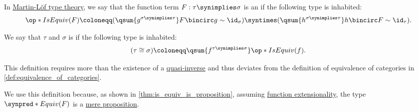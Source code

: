 \begin{definition}\label{def:equivalence_of_types}
  In \hyperref[def:martin_lof_type_theory]{Martin-L\"of type theory}, we say that the function term \( F: \tau \synimplies \sigma \) is an  if the following type is inhabited:
  \begin{equation*}
    \op*{IsEquiv}(F) \coloneqq (\qsum {g^{\sigma \synimplies \tau}} F \bincirc g \sim \id_\sigma) \syntimes (\qsum {h^{\sigma \synimplies \tau}} h \bincirc F \sim \id_\tau).
  \end{equation*}

  We say that \( \tau \) and \( \sigma \) is  if the following type is inhabited:
  \begin{equation*}
    (\tau \cong \sigma) \coloneqq \qsum {f^{\tau \synimplies \sigma}} \op*{IsEquiv}(f).
  \end{equation*}
\end{definition}
\begin{comments}
  \item This definition requires more than the existence of a \hyperref[def:arrow_type_quasi_inverse]{quasi-inverse} and thus deviates from the definition of equivalence of categories in \cref{def:equivalence_of_categories}.

  We use this definition because, as shown in \cref{thm:is_equiv_is_proposition}, assuming \hyperref[def:function_extensionality_axiom]{function extensionality}, the type \( \synpred*{Equiv}(F) \) is a \hyperref[def:mere_proposition]{mere proposition}.
\end{comments}

